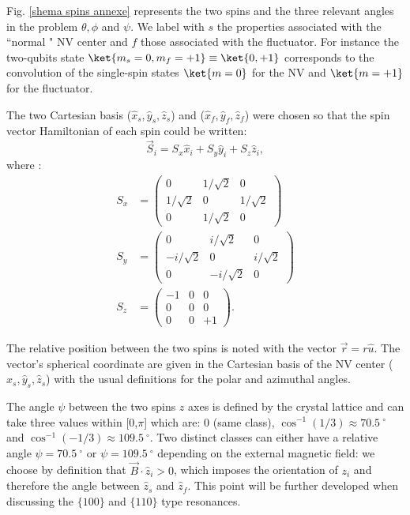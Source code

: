 \documentclass[a4paper, 11pt]{report}
\begin{document}
Fig. \ref{shema spins annexe} represents the two spins and the three relevant angles in the problem $\theta,\phi$ and $\psi$. We label with $s$ the properties associated with the ``normal " NV center and $f$ those associated with the fluctuator. For instance the two-qubits state $\ket{m_s=0,m_f=+1}\equiv\ket{0,+1}$ corresponds to the convolution of the single-spin states $\ket{m=0}$ for the NV and $\ket{m=+1}$ for the fluctuator.

The two Cartesian basis ($\hat x_s,\hat y_s,\hat z_s$) and ($\hat x_f,\hat y_f,\hat z_f$) were chosen so that the spin vector Hamiltonian of each spin could be written:
\begin{equation}
\vec{S}_i=S_x \hat x_i + S_y \hat{y}_i + S_z \hat{z}_i,
\end{equation}
where :
\begin{align*}
S_x&=\begin{pmatrix}
0&1/\sqrt{2}&0 \\
1/\sqrt{2}&0&1/\sqrt{2} \\
0&1/\sqrt{2}&0
\end{pmatrix} \\
S_y&=\begin{pmatrix}
0&i/\sqrt{2}&0 \\
-i/\sqrt{2}&0&i/\sqrt{2} \\
0&-i/\sqrt{2}&0
\end{pmatrix} \\
S_z&=\begin{pmatrix}
-1&0&0 \\
0&0&0 \\
0&0&+1
\end{pmatrix}.
\end{align*}

The relative position between the two spins is noted with the vector $\vec{r}=r\hat{u}$. The vector's spherical coordinate are given in the Cartesian basis of the NV center ($\hat x_s,\hat y_s,\hat z_s$) with the usual definitions for the polar and azimuthal angles.

The angle $\psi$ between the two spins $z$ axes is defined by the crystal lattice and can take three values within [0,$\pi$] which are: 0 (same class), $\cos^{-1}(1/3) \approx 70.5\ ^\circ$ and $\cos^{-1}(-1/3) \approx 109.5\ ^\circ$. Two distinct classes can either have a relative angle $\psi=70.5 \ ^\circ$ or $\psi=109.5 \ ^\circ$ depending on the external magnetic field: we choose by definition that $\vec{B}\cdot\hat{z}_i >0$, which imposes the orientation of $z_i$ and therefore the angle between $\hat z_s$ and $\hat z_f$. This point will be further developed when discussing the $\{100\}$ and $\{110\}$ type resonances.
\end{document}
